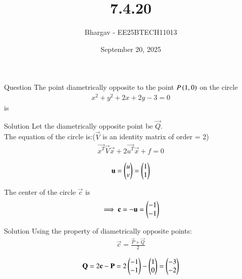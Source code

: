 \documentclass{beamer}
\title{7.4.20}
\date{September 20, 2025}
\author{Bhargav - EE25BTECH11013}
\begin{document}
\frame{\titlepage}

\begin{frame}{Question}
The point diametrically opposite to the point $P \left(1 , 0\right)$ on the circle 
\begin{align}
x^2 +y^2 + 2x + 2y - 3 =  0
\end{align} 
is
\end{frame}

\begin{frame}{Solution}
Let the diametrically opposite point be $\vec{Q}$.\\
The equation of the circle is:($\vec{V}$ is an identity matrix of order = 2)
\begin{align}
\vec{x^T}\vec{V}\vec{x} + 2\vec{u^T}\vec{x} + f = 0 
\end{align}

\begin{align}
\mathbf{u} = \begin{pmatrix}u \\ v\end{pmatrix} = \begin{pmatrix}1 \\ 1\end{pmatrix}
\end{align}

The center of the circle $\vec{c}$ is
\begin{align}
\implies \mathbf{c} = -\mathbf{u} = \begin{pmatrix}-1 \\ -1\end{pmatrix}
\end{align}
\end{frame}

\begin{frame}{Solution}
Using the property of diametrically opposite points:
\begin{align}
\vec{c} = \frac{\vec{P}+\vec{Q}}{2}
\end{align}

\begin{align}
\mathbf{Q} = 2\mathbf{c} - \mathbf{P} = 2\begin{pmatrix}-1 \\ -1\end{pmatrix} - \begin{pmatrix}1 \\ 0\end{pmatrix} = \begin{pmatrix}-3 \\ -2\end{pmatrix}
\end{align}
\end{frame}
\end{document}
